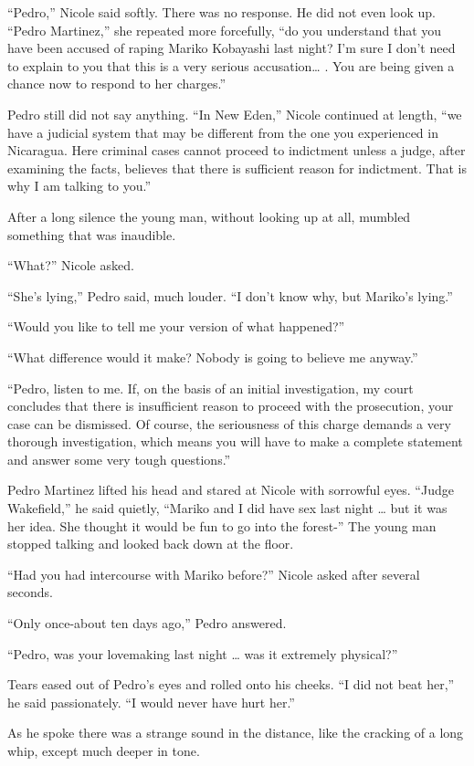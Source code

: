 \documentclass[]{article}
\begin{document}
{“Pedro,” Nicole said softly.  There was no response.  He did not even look up.  “Pedro Martinez,” she repeated more forcefully, “do you understand that you have been accused of raping Mariko Kobayashi last night? I’m sure I don’t need to explain to you that this is a very serious accusation… .  You are being given a chance now to respond to her charges.”

Pedro still did not say anything.  “In New Eden,” Nicole continued at length, “we have a judicial system that may be different from the one you experienced in Nicaragua.  Here criminal cases cannot proceed to indictment unless a judge, after examining the facts, believes that there is sufficient reason for indictment.  That is why I am talking to you.”

After a long silence the young man, without looking up at all, mumbled something that was inaudible.

“What?” Nicole asked.

“She’s lying,” Pedro said, much louder.  “I don’t know why, but Mariko’s lying.”

“Would you like to tell me your version of what happened?”

“What difference would it make? Nobody is going to believe me anyway.”

“Pedro, listen to me.  If, on the basis of an initial investigation, my court concludes that there is insufficient reason to proceed with the prosecution, your case can be dismissed.  Of course, the seriousness of this charge demands a very thorough investigation, which means you will have to make a complete statement and answer some very tough questions.”

Pedro Martinez lifted his head and stared at Nicole with sorrowful eyes.  “Judge Wakefield,” he said quietly, “Mariko and I did have sex last night … but it was her idea.  She thought it would be fun to go into the forest-” The young man stopped talking and looked back down at the floor.

“Had you had intercourse with Mariko before?” Nicole asked after several seconds.

“Only once-about ten days ago,” Pedro answered.

“Pedro, was your lovemaking last night … was it extremely physical?”

Tears eased out of Pedro’s eyes and rolled onto his cheeks.  “I did not beat her,” he said passionately.  “I would never have hurt her.”

As he spoke there was a strange sound in the distance, like the cracking of a long whip, except much deeper in tone.

}
\end{document}
